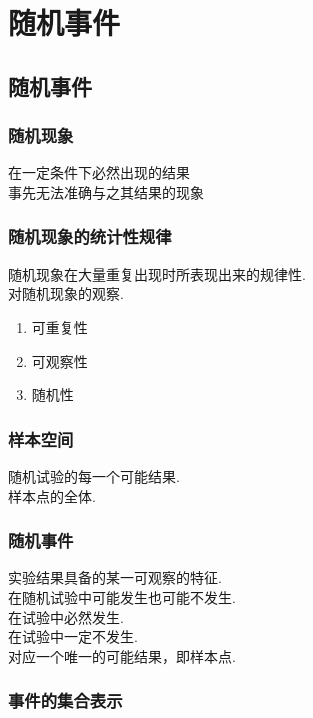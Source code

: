 \chapter{随机事件}
\thispagestyle{empty}
\section{随机事件}
\subsection{随机现象}
在一定条件下必然出现的结果\jg\\
事先无法准确与之其结果的现象\jg
\subsection{随机现象的统计性规律}
随机现象在大量重复出现时所表现出来的规律性.\jg\\
对随机现象的观察.\jg\\
\dya[随机试验的特点]
\begin{enumerate}[1.]
	\setlength{\itemindent}{3em}
	\setlength{\topsep}{0.01em}
	\setlength{\itemsep}{0.01em}
	\item 可重复性
	\item 可观察性
	\item 随机性
\end{enumerate}


\subsection{样本空间}
随机试验的每一个可能结果.\jg\\
样本点的全体.\jg

\subsection{随机事件}
实验结果具备的某一可观察的特征.\jg\\
在随机试验中可能发生也可能不发生.\jg\\
在试验中必然发生.\jg\\
在试验中一定不发生.\jg\\
对应一个唯一的可能结果，即样本点.\jg

\subsection{事件的集合表示}

